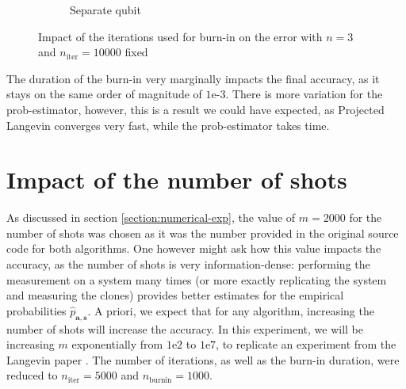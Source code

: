 \documentclass[12pt]{memoir}
\newcommand{\mb}{\mathbf}
\newcommand{\nitern}[1]{$n_{\text{iter}}=#1$}
\newcommand{\nburninn}[1]{$n_{\text{burnin}}=#1$}
\begin{document}
\begin{figure}[H]
\begin{subfigure}[b]{0.49\textwidth}
        \caption{Separate qubit}

        \label{fig:burnin-comp-sep-DG-sub}

    \end{subfigure}

    \caption{Impact of the iterations used for burn-in on the error with $n=3$ and \nitern{10000} fixed}

    \label{fig:burnin-comp}

\end{figure}

The duration of the burn-in very marginally impacts the final accuracy, as it stays on the same order of magnitude of $1\text{e-}3$. There is more variation for the prob-estimator, however, this is a result we could have expected, as Projected Langevin converges very fast, while the prob-estimator takes time.


\section{Impact of the number of shots}\label{section:comp-nb-shots}


As discussed in section \ref{section:numerical-exp}, the value of $m=2000$ for the number of shots was chosen as it was the number provided in the original source code for both algorithms. One however might ask how this value impacts the accuracy, as the number of shots is very information-dense: performing the measurement on a system many times (or more exactly replicating the system and measuring the clones) provides better estimates for the empirical probabilities $\hat p_{\mb a, \mb s}$. A priori, we expect that for any algorithm, increasing the number of shots will increase the accuracy. In this experiment, we will be increasing $m$ exponentially from $1\text{e}2$ to $1\text{e}7$, to replicate an experiment from the Langevin paper \cite{meth:bayesian:Langevin:ACMT2024}. The number of iterations, as well as the burn-in duration, were reduced to \nitern{5000} and \nburninn{1000}.
\end{document}
